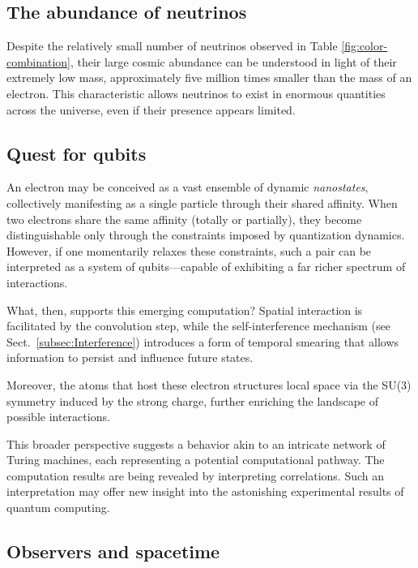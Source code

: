 \documentclass[12pt]{article}
\begin{document}
\subsection{The abundance of neutrinos}

Despite the relatively small number of neutrinos observed in Table \ref{fig:color-combination}, their large cosmic abundance can be understood in light of their extremely low mass, approximately five million times smaller than the mass of an electron. This characteristic allows neutrinos to exist in enormous quantities across the universe, even if their presence appears limited.

\subsection{Quest for qubits} \label{subsection:qubits}

An electron may be conceived as a vast ensemble of dynamic \textit{nanostates}, collectively manifesting as a single particle through their shared affinity. When two electrons share the same affinity (totally or partially), they become distinguishable only through the constraints imposed by quantization dynamics. However, if one momentarily relaxes these constraints, such a pair can be interpreted as a system of qubits—capable of exhibiting a far richer spectrum of interactions.

What, then, supports this emerging computation? Spatial interaction is facilitated by the convolution step, while the self-interference mechanism (see Sect.~\ref{subsec:Interference}) introduces a form of temporal smearing that allows information to persist and influence future states.

Moreover, the atoms that host these electron structures local space via the SU(3) symmetry induced by the strong charge, further enriching the landscape of possible interactions.

This broader perspective suggests a behavior akin to an intricate network of Turing machines, each representing a potential computational pathway. The computation results are being revealed by interpreting correlations. Such an interpretation may offer new insight into the astonishing experimental results of quantum computing.

\subsection{Observers and spacetime}  
\end{document}
